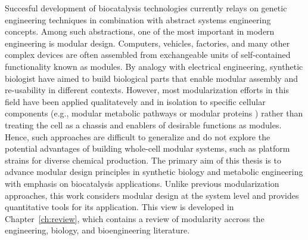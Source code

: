 Succesful development of biocatalysis technologies currently relays on genetic engineering techniques in combination with abstract systems engineering concepts.
Among such abstractions, one of the most important in modern engineering is modular design.
Computers, vehicles, factories, and many other complex devices are often assembled from exchangeable units of self-contained functionality known as modules.
By analogy with electrical engineering, synthetic biologist have aimed to build biological parts that enable modular assembly and re-usability in different contexts.
However, most modularization efforts in this field have been applied qualitatevely and in isolation to specific cellular components (e.g., modular metabolic pathways \citep{biggs2014} or modular proteins \citep{maervoet2017}) rather than treating the cell as a chassis and enablers of desirable functions as modules. %
Hence, such approaches are difficult to generalize and do not explore the potential advantages of building whole-cell modular systems, such as platform strains \citep{nielsen2016} for diverse chemical production.
The primary aim of this thesis is to advance modular design principles in synthetic biology and metabolic engineering with emphasis on biocatalysis applications.
Unlike previous modularization approaches, this work considers modular design at the system level and provides quantitative tools for its application.
This view is developed in Chapter~\ref{ch:review}, which contains a review of modularity accross the engineering, biology, and bioengineering literature.




